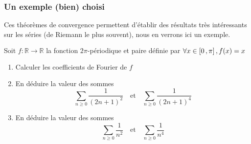     \subsubsection{Un exemple (bien) choisi}

    Ces théorèmes de convergence permettent d’établir des résultats très intéressants sur les séries (de Riemann le plus souvent), nous en verrons ici un exemple.

    \begin{exo}{}{}
        Soit $f : \mathbb{R} \rightarrow \mathbb{R}$ la fonction $2 \pi$-périodique et paire définie par $\forall x \in \left[ 0 \, , \pi \right], f(x) = x$
        \begin{enumerate}
            \item Calculer les coefficients de Fourier de $f$
            \item En déduire la valeur des sommes
            \[ \sum\limits_{n \geq 0} \frac{1}{(2n+1)^2} \quad \text{et} \quad \sum\limits_{n \geq 0} \frac{1}{(2n+1)^4} \]
            \item En déduire la valeur des sommes
            \[ \sum\limits_{n \geq 0} \frac{1}{n^2} \quad \text{et} \quad \sum\limits_{n \geq 0} \frac{1}{n^4} \]
        \end{enumerate}
    \end{exo}

